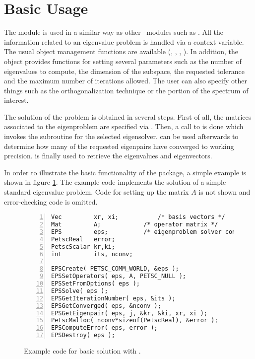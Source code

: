 \section{Basic Usage}

	The  module is used in a similar way as other \petsc\ modules such as . All the information related to an eigenvalue problem is handled via a context variable. The usual object management functions are available (, , , ). In addition, the  object provides functions for setting several parameters such as the number of eigenvalues to compute, the dimension of the subspace, the requested tolerance and the maximum number of iterations allowed. The user can also specify other things such as the orthogonalization technique or the portion of the spectrum of interest.

	The solution of the problem is obtained in several steps. First of all, the matrices associated to the eigenproblem are specified via . Then, a call to  is done which invokes the subroutine for the selected eigensolver.  can be used afterwards to determine how many of the requested eigenpairs have converged to working precision.  is finally used to retrieve the eigenvalues and eigenvectors. 

	In order to illustrate the basic functionality of the  package, a simple example is shown in figure \ref{fig:ex-eps}. The example code implements the solution of a simple standard eigenvalue problem. Code for setting up the matrix $A$ is not shown and error-checking code is omitted.

\begin{figure}[t]
\begin{Verbatim}[fontsize=\small,numbers=left,numbersep=6pt,xleftmargin=15mm]
Vec         xr, xi;           /* basis vectors */
Mat         A;            /* operator matrix */
EPS         eps;          /* eigenproblem solver context */
PetscReal   error;
PetscScalar kr,ki;
int         its, nconv;

EPSCreate( PETSC_COMM_WORLD, &eps );
EPSSetOperators( eps, A, PETSC_NULL );
EPSSetFromOptions( eps );
EPSSolve( eps );
EPSGetIterationNumber( eps, &its );
EPSGetConverged( eps, &nconv );
EPSGetEigenpair( eps, j, &kr, &ki, xr, xi );
PetscMalloc( nconv*sizeof(PetscReal), &error );
EPSComputeError( eps, error );
EPSDestroy( eps );
\end{Verbatim}
\caption{\label{fig:ex-eps}Example code for basic solution with .}
\end{figure}

